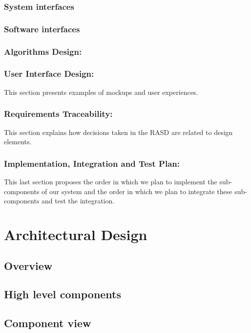 \documentclass [12pt]{article}
\begin{document}
\subsubsection{System interfaces}

\subsubsection{Software interfaces}

\subsubsection{Algorithms Design:}

\subsubsection{User Interface Design:}
This section presents examples of mockups and user experiences.
\subsubsection{Requirements Traceability:}
This section explains how decisions taken in the RASD are related to design elements.
\subsubsection{Implementation, Integration and Test Plan:}
This last section proposes the order in which we plan to implement the sub-components of our system and the order in which we plan to integrate these sub-components and test the integration.
\section{Architectural Design}
\subsection{Overview}

\subsection{High level components}


\subsection{Component view}
\end{document}

